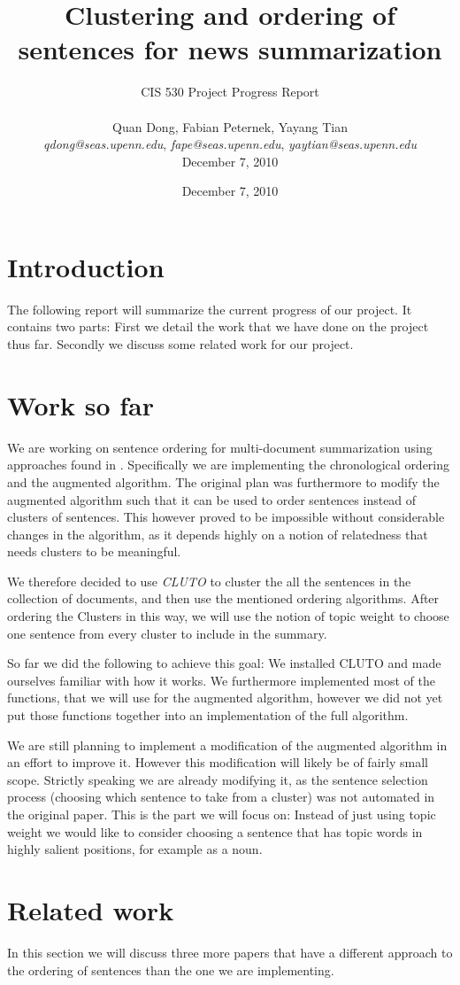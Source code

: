 \documentclass[11pt]{article}
\title{Clustering and ordering of sentences for news summarization}
\author{CIS 530 Project Progress Report\\
\\
Quan Dong, Fabian Peternek, Yayang Tian\\
\textit{qdong@seas.upenn.edu}, \textit{fape@seas.upenn.edu}, \textit{yaytian@seas.upenn.edu}\\
December 7, 2010}
\date{December 7, 2010}
\begin{document}
\maketitle

\section{Introduction}
The following report will summarize the current progress of our project. It contains two parts:
First we detail the work that we have done on the project thus far. Secondly we discuss some
related work for our project.
\section{Work so far}
We are working on sentence ordering for multi-document summarization using approaches found in
\cite{BarzilayEM02}. Specifically we are implementing the chronological ordering and the augmented
algorithm. The original plan was furthermore to modify the augmented algorithm such that it can be
used to order sentences instead of clusters of sentences. This however proved to be impossible
without considerable changes in the algorithm, as it depends highly on a notion of relatedness that
needs clusters to be meaningful.

We therefore decided to use \emph{CLUTO} to cluster the all the sentences in the
collection of documents, and then use the mentioned ordering algorithms. After ordering the Clusters
in this way, we will use the notion of topic weight to choose one sentence from every cluster to
include in the summary.

So far we did the following to achieve this goal: We installed CLUTO and made ourselves familiar
with how it works. We furthermore implemented most of the functions, that we will use for the
augmented algorithm, however we did not yet put those functions together into an implementation of
the full algorithm.

We are still planning to implement a modification of the augmented algorithm in an effort to improve
it. However this modification will likely be of fairly small scope. Strictly speaking we are already
modifying it, as the sentence selection process (choosing which sentence to take from a cluster) was
not automated in the original paper. This is the part we will focus on: Instead of just using topic
weight we would like to consider choosing a sentence that has topic words in highly salient
positions, for example as a noun.
\section{Related work}
In this section we will discuss three more papers that have a different approach to the ordering of
sentences than the one we are implementing.
\end{document}
